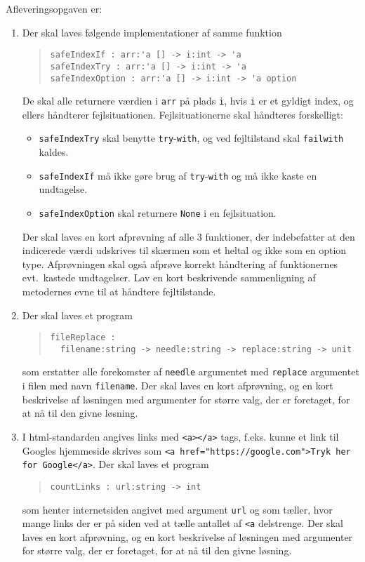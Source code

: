 \documentclass[a4paper,12pt]{article}
\begin{document}
Afleveringsopgaven er:
\begin{enumerate}[label=7i.\arabic*,start=0]
\item Der skal laves følgende implementationer af samme funktion
  \begin{quote}
    \mbox{\lstinline!safeIndexIf : arr:'a [] -> i:int -> 'a!}
    \\\mbox{\lstinline!safeIndexTry : arr:'a [] -> i:int -> 'a!}
    \\\mbox{\lstinline!safeIndexOption : arr:'a [] -> i:int -> 'a option!}
  \end{quote}
  De skal alle returnere værdien i \lstinline!arr! på plads \lstinline!i!, hvis \lstinline!i! er et gyldigt index, og ellers håndterer fejlsituationen.  Fejlsituationerne skal håndteres forskelligt:
  \begin{itemize}
  \item \lstinline!safeIndexTry! skal benytte \lstinline!try!-\lstinline!with!, og ved fejltilstand skal \lstinline!failwith! kaldes. 
  \item \lstinline!safeIndexIf! må ikke gøre brug af \lstinline!try!-\lstinline!with! og må ikke kaste en undtagelse. 
  \item \lstinline!safeIndexOption! skal returnere \lstinline!None! i en fejlsituation. 
  \end{itemize}
   Der skal laves en kort afprøvning af alle 3 funktioner, der indebefatter at den indicerede værdi udskrives til skærmen som et heltal og ikke som en option type. Afprøvningen skal også afprøve korrekt håndtering af funktionernes evt.\ kastede undtagelser.  Lav en kort beskrivende sammenligning af metodernes evne til at håndtere fejltilstande.
 \item Der skal laves et program
  \begin{quote}
    \lstinline!fileReplace :!
    \\\noindent\lstinline!  filename:string -> needle:string -> replace:string -> unit!
  \end{quote}
  som erstatter alle forekomster af \lstinline!needle! argumentet med \lstinline!replace! argumentet i filen med navn \lstinline!filename!. Der skal laves en kort afprøvning, og en kort beskrivelse af løsningen med argumenter for større valg, der er foretaget, for at nå til den givne løsning.
\item I html-standarden angives links med \lstinline!<a></a>! tags, f.eks. kunne et link til Googles hjemmeside skrives som \lstinline!<a href="https://google.com">Tryk her for Google</a>!. Der skal laves et program
  \begin{quote}
    \mbox{\lstinline!countLinks : url:string -> int!}
  \end{quote}
  som henter internetsiden angivet med argument \lstinline!url! og som tæller, hvor mange links der er på siden ved at tælle antallet af \lstinline!<a! delstrenge. Der skal laves en kort afprøvning, og en kort beskrivelse af løsningen med argumenter for større valg, der er foretaget, for at nå til den givne løsning.
\end{enumerate}
\end{document}
